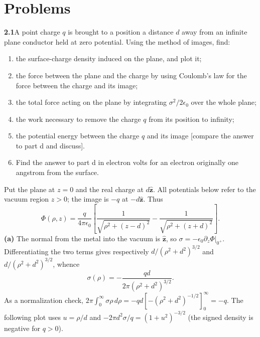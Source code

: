 
\section*{Problems}

\par\bigskip
\noindent\textbf{2.1}\quad A point charge $q$ is brought to a position a distance $d$ away from an infinite plane conductor held at zero potential. Using the method of images, find:
\begin{enumerate}
\item[(a)] the surface-charge density induced on the plane, and plot it;
\item[(b)] the force between the plane and the charge by using Coulomb's law for the force between the charge and its image;
\item[(c)] the total force acting on the plane by integrating $\sigma^{2}/2\epsilon_{0}$ over the whole plane;
\item[(d)] the work necessary to remove the charge $q$ from its position to infinity;
\item[(e)] the potential energy between the charge $q$ and its image [compare the answer to part d and discuss].
\item[(f)] Find the answer to part d in electron volts for an electron originally one angstrom from the surface.
\end{enumerate}
\solution
Put the plane at $z=0$ and the real charge at $d\widehat{\mathbf z}$.
All potentials below refer to the vacuum region $z>0$; the image is
$-q$ at $-d\widehat{\mathbf z}$. Thus
\[
\Phi(\rho,z)=\frac{q}{4\pi\epsilon _0}
 \left[\frac1{\sqrt{\rho^2+(z-d)^2}}
       -\frac1{\sqrt{\rho^2+(z+d)^2}}\right].
\]
\textbf{(a)} The normal from the metal into the vacuum is
$\widehat{\mathbf z}$, so $\sigma=-\epsilon _0\partial_z\Phi|_{0^+}$.
Differentiating the two terms gives respectively
$d/(\rho^2+d^2)^{3/2}$ and $d/(\rho^2+d^2)^{3/2}$, whence
\[
\boxed{\sigma(\rho)=-\frac{qd}{2\pi(\rho^2+d^2)^{3/2}}.}
\]
As a normalization check,
$2\pi\int_0^\infty\sigma\rho\,d\rho
=-qd[-(\rho^2+d^2)^{-1/2}]_0^\infty=-q$.
The following plot uses $u=\rho/d$ and
$-2\pi d^2\sigma/q=(1+u^2)^{-3/2}$ (the signed density is negative
for $q>0$).
\begin{center}
\end{center}
